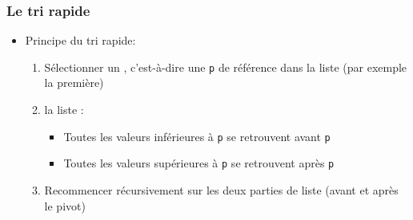 \documentclass[12pt]{linfo-beamer}
\begin{document}
\begin{frame}
    \frametitle{Le tri rapide}
\begin{itemize}
    \item Principe du tri rapide:
    \begin{enumerate}
    \item Sélectionner un , c'est-à-dire une
       \texttt{p} de référence dans la liste (par
      exemple la première)
    \item {} la liste :
      \begin{itemize}
      \item Toutes les valeurs inférieures à \texttt{p} se retrouvent
        avant \texttt{p}
      \item Toutes les valeurs supérieures à \texttt{p} se retrouvent
        après \texttt{p}
      \end{itemize}
    \item Recommencer récursivement sur les deux parties de liste
      (avant et après le pivot)
    \end{enumerate}
\end{itemize}

\end{frame}
\end{document}

